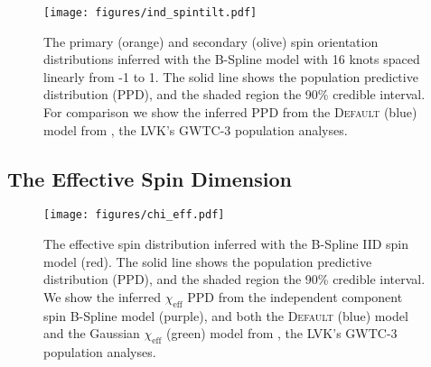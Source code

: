 \begin{figure}
    \begin{centering}
        \texttt{[image: figures/ind\_spintilt.pdf]}
        \caption{The primary (orange) and secondary (olive) spin orientation distributions inferred with the B-Spline model with 16 knots spaced linearly from -1 to 1. The solid line shows the population predictive distribution (PPD), and the shaded region the 90\% credible interval. 
        For comparison we show the inferred PPD from the \textsc{Default} (blue) model from \citet{o3b_astro_dist}, the LVK's GWTC-3 population analyses.}
        \label{fig:ind_spintilt_dist}
    \end{centering}
\end{figure}

\subsection{The Effective Spin Dimension}

\begin{figure} 
    \begin{centering}
        \texttt{[image: figures/chi\_eff.pdf]}
        \caption{The effective spin distribution inferred with the B-Spline IID spin model (red). The solid line shows the population predictive distribution (PPD), and the shaded region the 90\% credible interval. We show the inferred $\chi_\mathrm{eff}$ 
        PPD from the independent component spin B-Spline model (purple), and both the \textsc{Default} (blue) model and the 
        Gaussian $\chi_\mathrm{eff}$ (green) model from \citet{o3b_astro_dist}, the LVK's GWTC-3 population analyses.}
        \label{fig:chieff_dist}
    \end{centering}
\end{figure}

